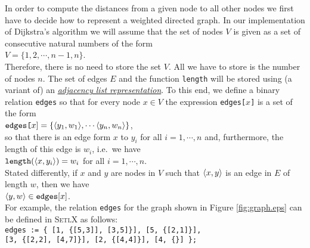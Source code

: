 In order to compute the distances from a given node to all other nodes we first have to decide how
to represent a weighted directed graph.  In our implementation of Dijkstra's algorithm we will
assume that the set of nodes $V$ is given as a set of consecutive natural numbers of the form
\\[0.2cm]
\hspace*{1.3cm}
$V = \{ 1, 2, \cdots, n-1, n \}$.
\\[0.2cm]
Therefore, there is no need to store the set $V$.  All we have to store is the number of nodes $n$.
The set of edges $E$ and the function \texttt{length} will be stored using (a variant of) an
\href{http://en.wikipedia.org/wiki/Adjacency_list}{\emph{adjacency list representation}}.
To this end, we define a binary relation \texttt{edges} so that for every node $x \in V$ the
expression \texttt{edges[$x$]} is a set of the form
\\[0.2cm]
\hspace*{1.3cm}
$\texttt{edges[}x\mathtt{]} = \{ \pair(y_1,w_1), \cdots \pair(y_n,w_n) \}$, 
\\[0.2cm]
so that there is an edge form $x$ to $y_i$ for all $i=1,\cdots,n$ and, furthermore, the length of
this edge is $w_i$, i.e.~we have 
\\[0.2cm]
\hspace*{1.3cm}
$\mathtt{length}(\pair(x,y_i)) = w_i$ \quad for all $i=1,\cdots,n$.
\\[0.2cm]
Stated differently, if $x$ and $y$ are nodes in $V$ such that $\pair(x,y)$ is an edge in $E$ of length
$w$, then we have
\\[0.2cm]
\hspace*{1.3cm}
$\pair(y,w) \in \mathtt{edges[}x\mathtt{]}$.
\\[0.2cm]
For example, the relation \texttt{edges} for the graph shown in Figure \ref{fig:graph.eps} can be
defined in \textsc{SetlX} as follows:
\\[0.2cm]
\hspace*{1.3cm}
\texttt{edges := \{ [1, \{[5,3]], [3,5]\}], [5, \{[2,1]\}], \\
\hspace*{3.25cm} 
[3, \{[2,2], [4,7]\}], [2, \{[4,4]\}], [4, \{\}] \};}

